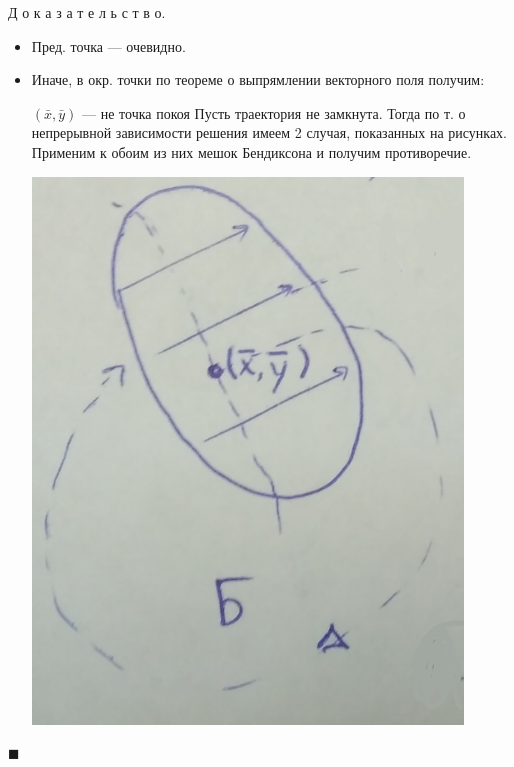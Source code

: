 \documentclass[oneside, final, 12pt]{article}
\theoremstyle{def}
\theoremstyle{th}
\theoremstyle{rem}
\renewenvironment{proof}{\par Д о к а з а т е л ь с т в о.}{\hfill$\blacksquare$}
\numberwithin{figure}{section}
\numberwithin{equation}{section}
\def\cntrKul{\hspace*{\fill}}
\begin{document}
	\begin{proof}
		\begin{itemize}
			\item Пред. точка --- очевидно. 
			\item Иначе, в окр. точки по теореме о выпрямлении векторного поля получим:
		
			\begin{minipage}{0.4\textwidth}
				\cntrKul $(\bar{x}, \bar{y})$ --- не точка покоя \cntrKul \newline
				Пусть траектория не замкнута. \newline 
				Тогда по т. о непрерывной зависимости решения имеем 2 случая,
				 	показанных на рисунках. Применим к обоим из них мешок Бендиксона и получим противоречие.
			\end{minipage}
				\hfill
			\begin{minipage}{0.24\textwidth}  \vspace{3mm}
			
				\begin{center} \includegraphics[width=0.9\textwidth]{pict/pict_9_1.png}\end{center} 
			\end{minipage}
			\begin{minipage}{0.24\textwidth} \vspace{4mm}
			

\end{minipage}
\end{itemize}
\end{proof}
\end{document}
